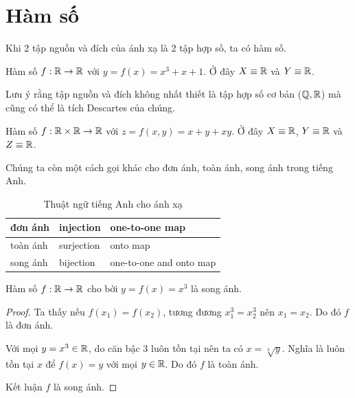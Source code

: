 \section{Hàm số}

Khi 2 tập nguồn và đích của ánh xạ là 2 tập hợp số, ta có hàm số.

\begin{example}
    Hàm số $f: \mathbb{R} \rightarrow \mathbb{R}$ với $y = f(x) = x^3 + x + 1$. Ở đây $X \equiv \mathbb{R}$ và $Y \equiv \mathbb{R}$.
\end{example}

Lưu ý rằng tập nguồn và đích không nhất thiết là tập hợp số cơ bản ($\mathbb{Q}, \mathbb{R}$) mà cũng có thể là tích Descartes của chúng.

\begin{example}
    Hàm số $f: \mathbb{R} \times \mathbb{R} \rightarrow \mathbb{R}$ với $z = f(x, y) = x + y + xy$. Ở đây $X \equiv \mathbb{R}$, $Y \equiv \mathbb{R}$ và $Z \equiv \mathbb{R}$.
\end{example}

Chúng ta còn một cách gọi khác cho đơn ánh, toàn ánh, song ánh trong tiếng Anh.

\begin{table}[ht]
    \centering
    \begin{tabular}{| l | l | l |}
        \hline
        đơn ánh & injection & one-to-one map \\
        \hline
        toàn ánh & surjection & onto map \\
        \hline
        song ánh & bijection & one-to-one and onto map \\
        \hline
    \end{tabular}

    \caption{Thuật ngữ tiếng Anh cho ánh xạ}
\end{table}

\begin{example}
    Hàm số $f: \mathbb{R} \rightarrow \mathbb{R}$ cho bởi $y = f(x) = x^3$ là song ánh.

    \begin{proof}
        Ta thấy nếu $f(x_1) = f(x_2)$, tương đương $x_1^3 = x_2^3$ nên $x_1 = x_2$. Do đó $f$ là đơn ánh.

        Với mọi $y = x^3 \in \mathbb{R}$, do căn bậc 3 luôn tồn tại nên ta có $x = \sqrt[3]{y}$. Nghĩa là luôn tồn tại $x$ để $f(x) = y$ với mọi $y \in \mathbb{R}$. Do đó $f$ là toàn ánh.

        Kết luận $f$ là song ánh.
    \end{proof}
\end{example}

